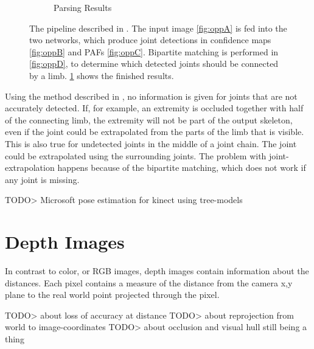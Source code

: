 \begin{figure}[h]
\begin{subfigure}[t]{0.24\textwidth}
    \caption{Parsing Results}
    \label{fig:oppE}
  \end{subfigure}
  \caption[OpenPose pipeline]{The pipeline described in \cite{cao2017realtime}. The input image \ref{fig:oppA} is fed into the two networks, which produce joint detections in confidence maps \ref{fig:oppB} and PAFs  \ref{fig:oppC}. Bipartite matching is performed in \ref{fig:oppD}, to determine which detected joints should be connected by a limb. \ref{fig:oppE} shows the finished results.}
  \label{fig:openpose_pipeline}
\end{figure}

Using the method described in \cite{cao2017realtime}, no information is given for joints that are not accurately detected. If, for example, an extremity is occluded together with half of the connecting limb, the extremity will not be part of the output skeleton, even if the joint could be extrapolated from the parts of the limb that is visible.
This is also true for undetected joints in the middle of a joint chain. The joint could be extrapolated using the surrounding joints. The problem with joint-extrapolation happens because of the bipartite matching, which does not work if any joint is missing.

TODO> Microsoft pose estimation for kinect using tree-models


\section{Depth Images}
In contrast to color, or RGB images, depth images contain information about the distances. Each pixel contains a measure of the distance from the camera x,y plane to the real world point projected through the pixel.

TODO> about loss of accuracy at distance
TODO> about reprojection from world to image-coordinates
TODO> about occlusion and visual hull still being a thing

